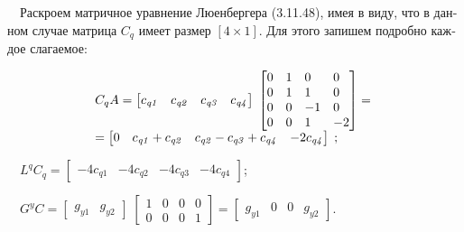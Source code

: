 \documentclass[a4paper]{article}
\begin{document}
{\begin{russian}\sffamily
\ \ Раскроем матричное уравнение Люенбергера (3.11.48), имея в виду, что в данном случае матрица  $C_q$ имеет размер 
$[4\times 1]$. Для этого запишем подробно каждое слагаемое:
\end{russian}}

\begin{equation*}
\begin{matrix}C_qA=\left[\begin{matrix}c_{\mathit{q1}}\hfill\null &c_{\mathit{q2}}\hfill\null
&c_{\mathit{q3}}\hfill\null &c_{\mathit{q4}}\hfill\null \end{matrix}\right]\;\left[\begin{matrix}0\hfill\null
&1\hfill\null &0\hfill\null &0\hfill\null \\0\hfill\null &1\hfill\null &1\hfill\null &0\hfill\null \\0\hfill\null
&0\hfill\null &-1\hfill\null &0\hfill\null \\0\hfill\null &0\hfill\null &1\hfill\null &-2\hfill\null
\end{matrix}\right]=\hfill\null \\=\left[\begin{matrix}0\hfill\null &c_{\mathit{q1}}+c_{\mathit{q2}}\hfill\null
&c_{\mathit{q2}}-c_{\mathit{q3}}+c_{\mathit{q4}}\hfill\null &-2c_{\mathit{q4}}\hfill\null
\end{matrix}\right]\;;\hfill\null \end{matrix}\hfill 
\end{equation*}
{\begin{russian}\sffamily
\ \ 
$L^qC_q=\left[\begin{matrix}-4c_{\mathit{q1}}&-4c_{\mathit{q2}}&-4c_{\mathit{q3}}&-4c_{\mathit{q4}}\end{matrix}\right]$;
\end{russian}}

{\begin{russian}\sffamily
\ \ 
$G^yC=\left[\begin{matrix}g_{\mathit{y1}}&g_{\mathit{y2}}\end{matrix}\right]\;\left[\begin{matrix}1&0&0&0\\0&0&0&1\end{matrix}\right]=\left[\begin{matrix}g_{\mathit{y1}}&0&0&g_{\mathit{y2}}\end{matrix}\right]$.
\end{russian}}
\end{document}
